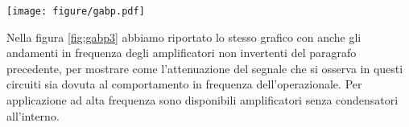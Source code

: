 \begin{SCfigure*}
    \texttt{[image: figure/gabp.pdf]}
    \caption{Nel grafico sono visibili gli stessi dati delle figure \ref{fig:freq_ris3} e \ref{fig:A_vs_freq3}, solo che sono
        mostrati assieme. Come si vede è proprio a causa dell'andamento del guadagno in frequenza dell'opamp che
        questi circuiti hanno una frequenza di taglio ed una riduzione del guadagno.}
    \label{fig:gabp3}
\end{SCfigure*}

Nella figura \ref{fig:gabp3} abbiamo riportato lo stesso grafico con anche gli andamenti in frequenza degli amplificatori
non invertenti del paragrafo precedente, per mostrare come l'attenuazione del segnale che si osserva in questi circuiti
sia dovuta al comportamento in frequenza dell'operazionale. Per applicazione ad alta frequenza sono disponibili
amplificatori senza condensatori all'interno.